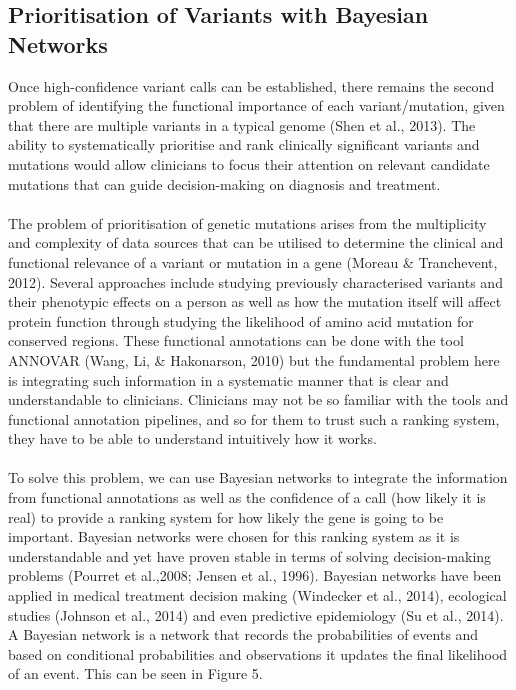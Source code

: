 \documentclass{article}
\begin{document}
\subsection{Prioritisation of Variants with Bayesian Networks }
Once high-confidence variant calls can be established, there remains the second problem of identifying the functional importance of each variant/mutation, given that there are multiple variants in a typical genome (Shen et al., 2013). The ability to systematically prioritise and rank clinically significant variants and mutations would allow clinicians to focus their attention on relevant candidate mutations that can guide decision-making on diagnosis and treatment.\\\\ The problem of prioritisation of genetic mutations arises from the multiplicity and complexity of data sources that can be utilised to determine the clinical and functional relevance of a variant or mutation in a gene (Moreau \& Tranchevent, 2012). Several approaches include studying previously characterised variants and their phenotypic effects on a person as well as how the mutation itself will affect protein function through studying the likelihood of amino acid mutation for conserved regions. These functional annotations can be done with the tool ANNOVAR (Wang, Li, \& Hakonarson, 2010) but the fundamental problem here is integrating such information in a systematic manner that is clear and understandable to clinicians. Clinicians may not be so familiar with the tools and functional annotation pipelines, and so for them to trust such a ranking system, they have to be able to understand intuitively how it works. \\\\ To solve this problem, we can use Bayesian networks to integrate the information from functional annotations as well as the confidence of a call (how likely it is real) to provide a ranking system for how likely the gene is going to be important. Bayesian networks were chosen for this ranking system as it is understandable and yet have proven stable in terms of solving decision-making problems (Pourret et al.,2008; Jensen et al., 1996). Bayesian networks have been applied in medical treatment decision making (Windecker et al., 2014), ecological studies (Johnson et al., 2014) and even predictive epidemiology (Su et al., 2014). A Bayesian network is a network that records the probabilities of events and based on conditional probabilities and observations it updates the final likelihood of an event. This can be seen in Figure 5.
\end{document}
